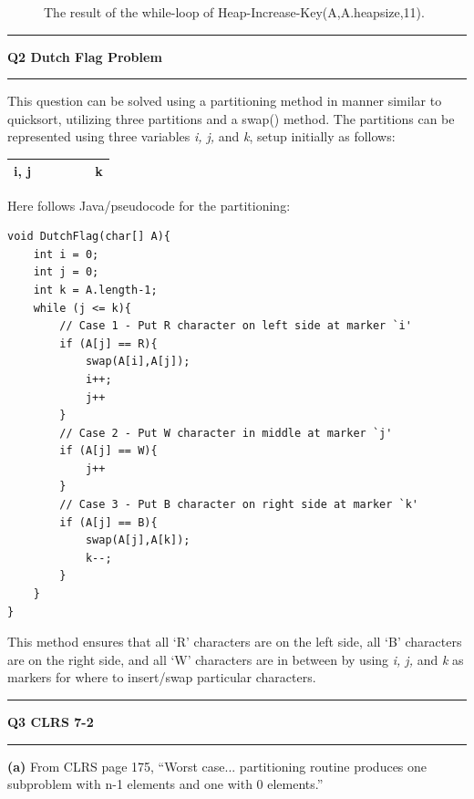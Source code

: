 \documentclass[11pt]{article}
\newcommand\question[2]{\vspace{.25in}\hrule\textbf{#1 #2}\vspace{.5em}\hrule\vspace{.10in}}
\renewcommand\part[1]{\vspace{.10in}\textbf{(#1)}}
\begin{document}
\begin{figure}[htbp!]
\centering
{}
\caption*{The result of the while-loop of Heap-Increase-Key(A,A.heapsize,11).}
\end{figure}
\newpage

\question{Q2}{   Dutch Flag Problem}
This question can be solved using a partitioning method in manner similar to quicksort, utilizing three partitions and a swap() method. The partitions can be represented using three variables \textit{i, j,} and \textit{k}, setup initially as follows:

\begin{table}[htbp!]
\centering
\begin{tabular}{|l|l|l|l|l|l|}
\hline
i, j &  &  &  &  & k \\ \hline
\end{tabular}
\end{table}

Here follows Java/pseudocode for the partitioning:
\begin{lstlisting}
void DutchFlag(char[] A){
	int i = 0;
	int j = 0;
	int k = A.length-1;
	while (j <= k){
		// Case 1 - Put R character on left side at marker `i'
		if (A[j] == R){
			swap(A[i],A[j]);
			i++;
			j++
		}
		// Case 2 - Put W character in middle at marker `j'
		if (A[j] == W){
			j++
		}
		// Case 3 - Put B character on right side at marker `k'
		if (A[j] == B){
			swap(A[j],A[k]);
			k--;
		}
	}
}
\end{lstlisting}

This method ensures that all `R' characters are on the left side, all `B' characters are on the right side, and all `W' characters are in between by using \textit{i, j,} and \textit{k} as markers for where to insert/swap particular characters.

\question{Q3}{   CLRS 7-2}
\part{a}
From CLRS page 175, ``Worst case... partitioning routine produces one subproblem with n-1 elements and one with 0 elements.''
\end{document}
